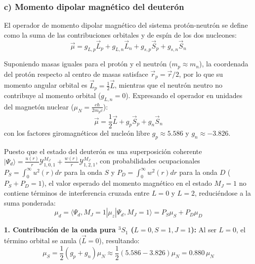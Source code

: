 \begin{problema}
\begin{center}
\end{center}

\subsubsection*{c) Momento dipolar magnético del deuterón}

El operador de momento dipolar magnético del sistema protón-neutrón se define como la suma de las contribuciones orbitales y de espín de los dos nucleones:
\begin{equation}
\vec{\mu} = g_{L,p} \vec{L}_p + g_{L,n} \vec{L}_n + g_{s,p} \vec{S}_p + g_{s,n} \vec{S}_n
\end{equation}

Suponiendo masas iguales para el protón y el neutrón ($m_p \approx m_n$), la coordenada del protón respecto al centro de masas satisface $\vec{r}_p = \vec{r}/2$, por lo que su momento angular orbital es $\vec{L}_p = \frac{1}{2}\vec{L}$, mientras que el neutrón neutro no contribuye al momento orbital ($g_{L,n} = 0$). Expresando el operador en unidades del magnetón nuclear ($\mu_N = \frac{e\hbar}{2 m_p c}$):
\begin{equation}
\vec{\mu} = \frac{1}{2} \vec{L} + g_p \vec{S}_p + g_n \vec{S}_n
\end{equation}
con los factores giromagnéticos del nucleón libre $g_p \approx 5.586$ y $g_n \approx -3.826$.

Puesto que el estado del deuterón es una superposición coherente $|\Psi_d\rangle = \frac{u(r)}{r} \mathcal{Y}_{1,0,1}^{M_J} + \frac{w(r)}{r} \mathcal{Y}_{1,2,1}^{M_J}$, con probabilidades ocupacionales $P_S = \int_0^\infty u^2(r) dr$ para la onda $S$ y $P_D = \int_0^\infty w^2(r) dr$ para la onda $D$ ($P_S + P_D = 1$), el valor esperado del momento magnético en el estado $M_J = 1$ no contiene términos de interferencia cruzada entre $L=0$ y $L=2$, reduciéndose a la suma ponderada:
\begin{equation}
\mu_d = \langle \Psi_d, M_J=1 | \mu_z | \Psi_d, M_J=1 \rangle = P_S \mu_S + P_D \mu_D
\end{equation}

\textbf{1. Contribución de la onda pura ${}^3S_1$ ($L=0, S=1, J=1$):}
Al ser $L=0$, el término orbital se anula ($\vec{L}=0$), resultando:
\begin{equation}
\mu_S = \frac{1}{2} (g_p + g_n) \mu_N \approx \frac{1}{2} (5.586 - 3.826) \mu_N = 0.880 \, \mu_N
\end{equation}


\end{problema}
